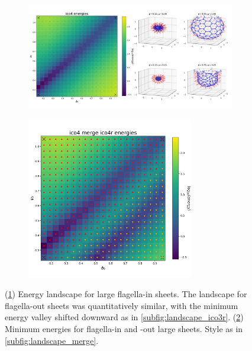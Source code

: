 \begin{figure}
	\centering
	\begin{subfigure}[b]{\textwidth}
		\centering
		\includegraphics[width=\textwidth]{landscape_ico4.png}
		\caption{}
		\label{subfig:landscape_ico4}
	\end{subfigure}
	\begin{subfigure}[b]{\textwidth}
		\centering
		\includegraphics[width=0.8\textwidth]{landscape_ico4ico4r_merge.png}
		\caption{}
		\label{subfig:landscape4_merge}
	\end{subfigure}
	\caption[Energy landscape for flagella-in and flagella-out curved sheets]{(\ref{subfig:landscape_ico4}) Energy landscape for large flagella-in sheets. The landscape for flagella-out sheets was quantitatively similar, with the minimum energy valley shifted downward as in \cref{subfig:landscape_ico3r}. (\ref{subfig:landscape4_merge}) Minimum energies for flagella-in and -out large sheets. Style as in \cref{subfig:landscape_merge}.}
	\label{fig:landscape_ico4}
\end{figure}

